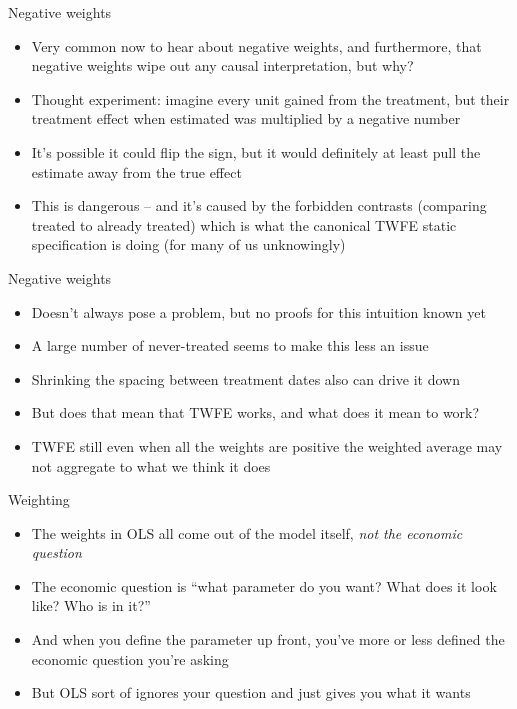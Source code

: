 \documentclass{beamer}
\begin{document}
\begin{frame}{Negative weights}

\begin{itemize}
\item Very common now to hear about negative weights, and furthermore, that negative weights wipe out any causal interpretation, but why?
\item Thought experiment: imagine every unit gained from the treatment, but their treatment effect when estimated was multiplied by a negative number
\item It's possible it could flip the sign, but it would definitely at least pull the estimate away from the true effect
\item This is dangerous -- and it's caused by the forbidden contrasts (comparing treated to already treated) which is what the canonical TWFE static specification is doing (for many of us unknowingly)
\end{itemize}

\end{frame}



\begin{frame}{Negative weights}

\begin{itemize}
\item Doesn't always pose a problem, but no proofs for this intuition known yet
\item A large number of never-treated seems to make this less an issue
\item Shrinking the spacing between treatment dates also can drive it down
\item But does that mean that TWFE works, and what does it mean to work?
\item TWFE still even when all the weights are positive the weighted average may not aggregate to what we think it does
\end{itemize}

\end{frame}

\begin{frame}{Weighting}

\begin{itemize}
\item The weights in OLS all come out of the model itself, \emph{not the economic question}
\item The economic question is ``what parameter do you want? What does it look like? Who is in it?''
\item And when you define the parameter up front, you've more or less defined the economic question you're asking
\item But OLS sort of ignores your question and just gives you what it wants
\end{itemize}

\end{frame}
\end{document}
